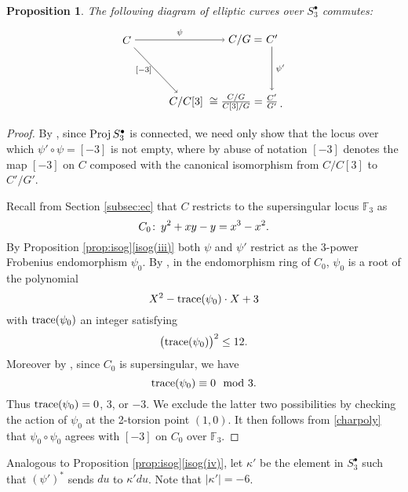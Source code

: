 \documentclass{gtpart}
\newtheorem{prop}[thm]{Proposition}
\theoremstyle{definition}
\theoremstyle{remark}
\def\co{\colon\thinspace}
\newcommand{\mb}[1]{\mathbb{#1}}
\newcommand{\Proj}{{\rm Proj\thinspace}}
\newcommand{\BF}{{\mb F}}
\newcommand{\md}{~~{\rm mod}~}
\newcommand{\K}{\kappa}
\newcommand{\s}{S^\bullet}
\newcommand{\isog}[1]{Proposition \ref{prop:isog}\thinspace \eqref{isog(#1)}}
\begin{document}
\begin{prop}
\label{prop:frob^2}
 The following diagram of elliptic curves over $\s_3$ commutes: 
 \begin{equation}
 \label{frob^2}
  \begin{tikzpicture}[baseline=(current bounding box.center)]
          \node (LT) at (0, 2) {$C$}; 
          \node (MT) at (3.8, 2) {$C/G = $}; 
          \node (RT) at (4.65, 2.04) {$C'$}; 
          \node (LB) at (1.9, 0) {$C/C[3]$}; 
          \node (MB) at (3.5, 0) {$\cong \frac{C/G}{C[3]/G} = $}; 
          \node (RB) at (4.65, 0.025) {$\frac{C'}{G'}$}; 
          \node at (4.95, -0.15) {.}; 
          \draw [->] (LT) -- node [above] {$\scriptstyle \psi$} (MT); 
          \draw [->] (LT) -- node [left] {$\scriptstyle [-3]$} (LB); 
          \draw [->] (RT) -- node [right] {$\scriptstyle \psi'$} (RB); 
  \end{tikzpicture}
 \end{equation}
\end{prop}
\begin{proof}
 By \cite[2.4.2]{KM}, since $\Proj \s_3$ is connected, we need only show 
 that the locus over which $\psi' \circ \psi = [-3]$ is not empty, where 
 by abuse of notation $[-3]$ denotes the map $[-3]$ on $C$ composed with 
 the canonical isomorphism from $C/C[3]$ to $C'/G'$.  

 Recall from Section \ref{subsec:ec} that $C$ restricts to the 
 supersingular locus $\BF_3$ as 
 \[
  C_0 \co y^2 + x y - y = x^3 - x^2.  
 \]
 By \isog{iii} both $\psi$ and $\psi'$ restrict as the 3-power Frobenius 
 endomorphism $\psi_0$.  By \cite[2.6.3]{KM}, in the endomorphism ring 
 of $C_0$, $\psi_0$ is a root of the polynomial 
 \begin{equation}
 \label{charpoly}
  X^2 - {\rm trace}(\psi_0) \cdot X + 3 
 \end{equation}
 with ${\rm trace}(\psi_0)$ an integer satisfying 
 \[
  \big( {\rm trace}(\psi_0) \big)^2 \leq 12.  
 \]
 Moreover by \cite[Exercise 5.10a]{AEC}, since $C_0$ is supersingular, 
 we have 
 \[
  {\rm trace}(\psi_0) \equiv 0 \md 3.  
 \]
 Thus ${\rm trace}(\psi_0) = 0$, 3, or $-3$.  We exclude the latter two 
 possibilities by checking the action of $\psi_0$ at the 2-torsion point 
 $(1,0)$.  It then follows from \eqref{charpoly} that 
 $\psi_0 \circ \psi_0$ agrees with $[-3]$ on $C_0$ over $\BF_3$.  
\end{proof}

Analogous to \isog{iv}, let $\K'$ be the element in $\s_3$ such that 
$(\psi')^*$ sends $du$ to $\K' du$.  Note that $|\K'| = -6$.  
\end{document}
